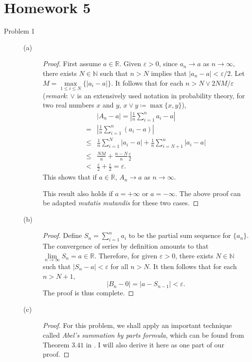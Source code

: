 \documentclass{article}
\newcommand{\eps}{\varepsilon}
\newcommand{\real}{\mathbb{R}}
\newcommand{\nn}{\mathbb{N}}
\theoremstyle{definition}
\theoremstyle{plain}
\theoremstyle{remark}
\begin{document}
\section*{Homework 5}
\begin{description}
\item[Problem 1]
\begin{description}
\item[(a)] 
\begin{proof}
First assume $a \in \real$. Given $\eps > 0$, since $a_n \to a$ as $n \to \infty$, there exists $N \in \nn$ such that $n > N$ implies that $|a_n - a| < \eps/2$. Let $M = \max\limits_{1 \leq i \leq N} \{|a_i - a|\}$. It follows that
for each $n > N \vee 2NM/\eps$ (\emph{remark}: $\vee$ is an extensively used notation 
in probability theory, for two real numbers $x$ and $y$, $x \vee y \coloneqq \max\{x, 
y\}$),
\begin{align*}
& |A_n - a| = \left|\frac{1}{n}\sum_{i = 1}^n a_i - a\right| \\
= & \left|\frac{1}{n}\sum_{i = 1}^n (a_i - a)\right| \\
\leq & \frac{1}{n}\sum_{i = 1}^N |a_i - a| + \frac{1}{n}\sum_{i = N + 1}^n |a_i - a| \\
\leq & \frac{NM}{n} + \frac{n - N}{n}\frac{\eps}{2} \\
< & \frac{\eps}{2} + \frac{\eps}{2} = \eps.
\end{align*}
This shows that if $a \in \real$, $A_n \to a$ as $n \to \infty$.

This result also holds if $a = +\infty$ or $a = -\infty$. The above proof can be adapted \emph{mutatis mutandis} for these two cases.
\end{proof}

\item[(b)] 
\begin{proof}
Define $S_n = \sum_{i = 1}^n a_i$ to be the partial sum sequence for $\{a_n\}$. The convergence of series by definition amounts to that $\lim\limits_{n \to \infty} S_n = a \in \real$. Therefore, for given $\eps > 0$, there exists $N \in \nn$ such that $|S_n - a| < \eps$ for all $n > N$. It then follows that for each $n > N + 1$, 
$$|B_n - 0| = |a - S_{n - 1}| < \eps.$$
The proof is thus complete. 
\end{proof}

\item[(c)] 
\begin{proof}
For this problem, we shall apply an important technique called \emph{Abel's summation 
by parts formula}, which can be found from Theorem $3.41$ in \cite{rudin1964}. I will 
also derive it here as one part of our proof.


\end{proof}
\end{description}
\end{description}
\end{document}
